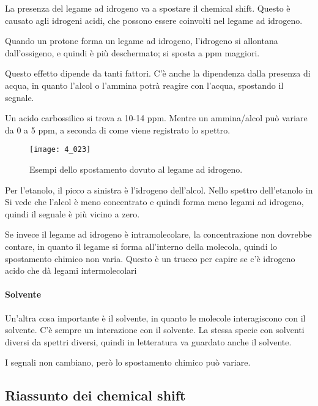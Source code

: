 La presenza del legame ad idrogeno va a spostare il chemical shift. Questo è
causato agli idrogeni acidi, che possono essere coinvolti nel legame ad idrogeno.

Quando un protone forma un legame ad idrogeno, l'idrogeno si allontana
dall'ossigeno, e quindi è più deschermato; si sposta a ppm maggiori.


Questo effetto dipende da tanti fattori. C'è anche la dipendenza dalla
presenza di acqua, in quanto l'alcol o l'ammina potrà reagire con
l'acqua, spostando il segnale.

Un acido carbossilico si trova a 10-14 ppm. Mentre un ammina/alcol può
variare da 0 a 5 ppm, a seconda di come viene registrato lo spettro.

\begin{figure}[H]
  \texttt{[image: 4\_023]}
  \caption{Esempi dello spostamento dovuto al legame ad idrogeno.}
\end{figure}

Per l'etanolo, il picco a sinistra è l'idrogeno dell'alcol. Nello spettro dell'etanolo in Si vede che l'alcol è meno concentrato e quindi forma meno legami ad idrogeno, quindi il segnale è più vicino
a zero.


Se invece il legame ad idrogeno è intramolecolare, la concentrazione non dovrebbe
contare, in quanto il legame si forma all'interno della molecola,
quindi lo spostamento chimico non varia. Questo è un trucco per capire
se c'è idrogeno acido che dà legami intermolecolari

\paragraph{Solvente}

Un'altra cosa importante è il solvente, in quanto le molecole
interagiscono con il solvente. C'è sempre un interazione con il
solvente. La stessa specie con solventi diversi da spettri diversi,
quindi in letteratura va guardato anche il solvente.


I segnali non cambiano, però lo spostamento chimico può variare.

\subsection{Riassunto dei chemical shift}

